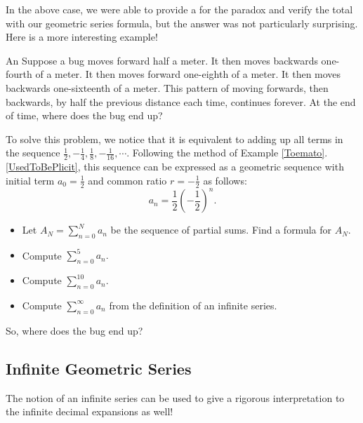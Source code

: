 In the above case, we were able to provide a  for the paradox and verify the total with our geometric series formula, but the answer was not particularly surprising.  Here is a more interesting example! 

\begin{exercise}{An  \Coffeecup \Coffeecup \Coffeecup}\label{alternatebug}
Suppose a bug moves forward half a meter.  It then moves backwards one-fourth of a meter. It then moves forward one-eighth of a meter.  It then moves backwards one-sixteenth of a meter.  This pattern of moving forwards, then backwards, by half the previous distance each time, continues forever.  At the end of time, where does the bug end up?

To solve this problem, we notice that it is equivalent to adding up all terms in the sequence $\frac{1}{2},-\frac{1}{4},\frac{1}{8},-\frac{1}{16},\cdots $.  Following the method of Example \ref{Toemato}.\ref{UsedToBePlicit},
this sequence can be expressed as a geometric sequence with initial term $a_0=\frac{1}{2}$ and common ratio $r=-\frac{1}{2}$ as follows: $$ a_n=\frac{1}{2}\left( -\frac{1}{2} \right) ^n.$$
\begin{itemize}
\item Let $A_N=\sum_{n=0}^N a_n$ be the sequence of partial sums.  Find a formula for $A_N$. 
\vspace*{1in}
\item  Compute $ \sum_{n=0}^{5} a_n.$
\vspace*{1in}
\item  Compute $ \sum_{n=0}^{10} a_n.$
\vspace*{1in}
\item Compute $ \sum_{n=0}^{\infty} a_n$ from the definition of an infinite series.
\vspace*{1in}
\end{itemize}

So, where does the bug end up?
\vspace*{.5in}
\end{exercise}
\subsection{Infinite Geometric Series}\label{Geometrickery}
The notion of an infinite series can be used to give a rigorous interpretation to the infinite decimal expansions as well! 

